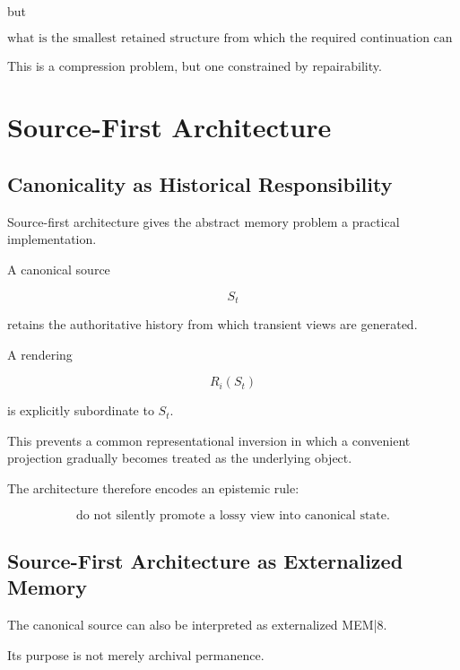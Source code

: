 \documentclass[11pt]{article}
\theoremstyle{remark}
\newcommand{\MEM}{\textsc{MEM|8}}
\begin{document}
but

\begin{equation}
\text{what is the smallest retained structure from which the required continuation can be regenerated?}
\end{equation}

This is a compression problem, but one constrained by repairability.

\section{Source-First Architecture}

\subsection{Canonicality as Historical Responsibility}

Source-first architecture gives the abstract memory problem a practical implementation.

A canonical source

\begin{equation}
S_t
\end{equation}

retains the authoritative history from which transient views are generated.

A rendering

\begin{equation}
R_i(S_t)
\end{equation}

is explicitly subordinate to $S_t$.

This prevents a common representational inversion in which a convenient projection gradually becomes treated as the underlying object.

The architecture therefore encodes an epistemic rule:

\begin{equation}
\boxed{
\text{do not silently promote a lossy view into canonical state}.
}
\end{equation}

\subsection{Source-First Architecture as Externalized Memory}

The canonical source can also be interpreted as externalized \MEM{}.

Its purpose is not merely archival permanence.
\end{document}
